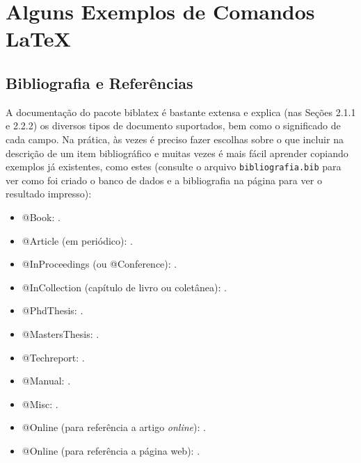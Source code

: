 
\chapter{Alguns Exemplos de Comandos \LaTeX{}}
\label{chap:exemplos}

\section{Bibliografia e Referências}

A documentação do pacote biblatex \citep{biblatex} é
bastante extensa e explica (nas Seções 2.1.1 e 2.2.2) os diversos
tipos de documento suportados, bem como o significado de cada campo.
Na prática, às vezes é preciso fazer escolhas sobre
o que incluir na descrição de um item bibliográfico e muitas vezes
é mais fácil aprender copiando exemplos já existentes, como estes (consulte o
arquivo \texttt{bibliografia.bib} para ver como foi criado o banco de dados e a
bibliografia na página \pageref{bibliografia} para ver o resultado impresso):

\begin{multicols}{2}
  \begin{itemize}
    \item @Book: \cite{Knuth:96}.

    \item @Article (em periódico): \cite{floats2014}.

    \item @InProceedings (ou @Conference): \cite{alves03:simi}.

    \item @InCollection (capítulo de livro ou coletânea): \cite{bobaoglu93:concepts}.

    \item @PhdThesis: \cite{garcia01:PhD}.

    \item @MastersThesis: \cite{schmidt03:MSc}.

    \item @Techreport: \cite{alvisi99:analysisCIC}.

    \item @Manual: \cite{biblatex}.

    \item @Misc: \cite{gridftp}.

    \item @Online (para referência a artigo \emph{online}): \cite{fowler04:designDead}.

    \item @Online (para referência a página web): \cite{FSF:GNU-GPL}.
  \end{itemize}
\end{multicols}


